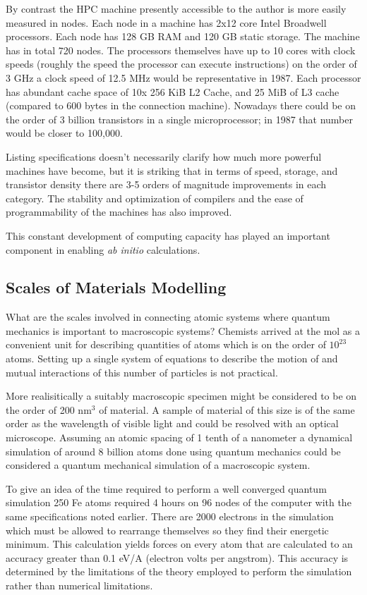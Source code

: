 By contrast the HPC machine presently accessible to the author 
is more easily measured in nodes. Each node in a machine has 2x12 core Intel Broadwell processors.
Each node has 128 GB RAM and 120 GB static storage. The machine has in total 720 nodes. 
The processors themselves have up to 10 cores with clock speeds (roughly the speed the
processor can execute instructions) on the order of 3 GHz a clock speed 
of 12.5 MHz would be representative in 1987. 
Each processor has abundant cache space of 10x 256 KiB L2 Cache, and 25 MiB of L3 cache 
(compared to 600 bytes in the connection machine). 
Nowadays there could be on the order of 3 billion transistors in a single microprocessor;
in 1987 that number would be closer to 100,000. 

Listing specifications doesn't necessarily clarify how much more powerful machines have become, 
but it is striking that in terms of speed, storage, and transistor density 
there are 3-5 orders of magnitude improvements in each category. 
The stability and optimization of compilers and the ease of programmability
of the machines has also improved.

This constant development of computing capacity has played an important component in enabling
{\it ab initio} calculations. 

\subsection{Scales of Materials Modelling}
What are the scales involved in connecting atomic systems where quantum mechanics is important
to macroscopic systems? Chemists arrived at the mol as a convenient unit for describing
quantities of atoms which is on the order of $10^{23}$ atoms. Setting up a single 
system of equations to describe the motion of and mutual interactions of 
this number of particles is not practical.

More realisitically a suitably macroscopic specimen might be considered to be on the 
order of 200 nm$^{3}$ of material. A sample of material of this size is of the 
same order as the wavelength of visible light and could be
resolved with an optical microscope. Assuming an atomic spacing of 1 tenth of a nanometer 
a dynamical simulation of around 8 billion atoms done using quantum mechanics 
could be considered a quantum mechanical simulation of a macroscopic system. 

To give an idea of the time required to perform a well converged quantum simulation 
250 Fe atoms required 4 hours on 96 nodes of the computer with the same 
specifications noted earlier. There are 2000 electrons in the simulation which must be allowed
to rearrange themselves so they find their energetic minimum. This calculation yields forces on every 
atom that are calculated to an accuracy greater than 0.1 eV/A (electron volts per angstrom).
This accuracy is determined by the limitations of the theory employed to perform the simulation
rather than numerical limitations.

